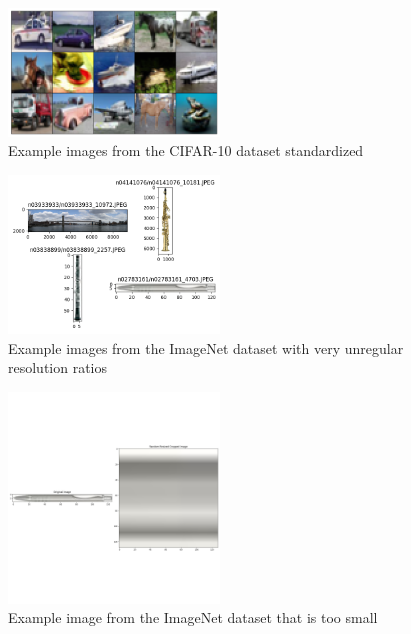     \begin{figure}
        \centering
        \includegraphics[width=0.5\textwidth]{../../sample_images/cifar_rbatch}
        \caption{Example images from the CIFAR-10 dataset standardized}
        \label{fig:cifar10_example_normalized}
    \end{figure}

    \begin{figure}
        \centering
        \includegraphics[width=0.5\textwidth]{../../sample_images/optima_shape_examples}
        \caption{Example images from the ImageNet dataset with very unregular resolution ratios}
        \label{fig:optimal_resolution}
    \end{figure}

    \begin{figure}
        \centering
        \includegraphics[width=0.5\textwidth]{../../sample_images/random_resized_crop_small}
        \caption{Example image from the ImageNet dataset that is too small}
        \label{fig:small_image}
    \end{figure}